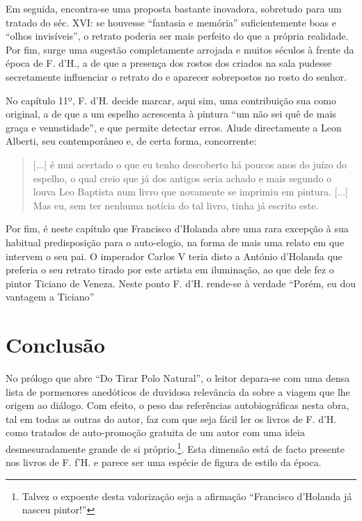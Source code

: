\documentclass{article}
\begin{document}
Em seguida, encontra-se uma proposta bastante inovadora, sobretudo
para um tratado do séc. XVI: se houvesse ``fantasia e memória''
suficientemente boas e ``olhos invisíveis'', o retrato poderia ser
mais perfeito do que a própria realidade. Por fim, surge uma sugestão
completamente arrojada e muitos séculos à frente da época de F. d'H.,
a de que a presença dos rostos dos criados na sala pudesse
secretamente influenciar o retrato do e aparecer sobrepostos no rosto
do senhor.

No capítulo 11º, F. d'H. decide marcar, aqui sim, uma contribuição sua
como original, a de que a um espelho acrescenta à pintura ``um não sei
quê de mais graça e venustidade'', e que permite detectar erros. Alude
directamente a Leon Alberti, seu contemporâneo e, de certa forma,
concorrente\cite[p.41]{holanda}:

\begin{quote}
  [...] é mui acertado o que eu tenho descoberto há poucos anos do
  juízo do espelho, o qual creio que já dos antigos seria achado e
  mais segundo o louva Leo Baptista num livro que novamente se
  imprimiu em pintura. [...] Mas eu, sem ter nenhuma notícia do tal
  livro, tinha já escrito este.
\end{quote}

Por fim, é neste capítulo que Francisco d'Holanda abre uma rara
excepção à sua habitual predisposição para o auto-elogio, na forma de
mais uma relato em que intervem o seu pai. O imperador Carlos V teria
disto a António d'Holanda que preferia o seu retrato tirado por este
artista em iluminação, ao que dele fez o pintor Ticiano de
Veneza. Neste ponto F. d'H. rende-se à verdade ``Porém, eu dou
vantagem a Ticiano''\cite[p.42]{holanda}

\section{Conclusão}

No prólogo que abre ``Do Tirar Polo Natural'', o leitor depara-se com
uma densa lista de pormenores anedóticos de duvidosa relevância da
sobre a viagem que lhe origem ao diálogo. Com efeito, o peso das
referências autobiográficas nesta obra, tal em todas as outras do
autor, faz com que seja fácil ler os livros de F. d'H. como tratados
de auto-promoção gratuita de um autor com uma ideia desmesuradamente
grande de si próprio.\footnote{Talvez o expoente desta valorização
  seja a afirmação ``Francisco d'Holanda já nasceu
  pintor!''\cite{teresa-desenho}}. Esta dimensão está de facto
presente nos livros de F. f'H. e parece ser uma espécie de figura de
estilo da época.
\end{document}

